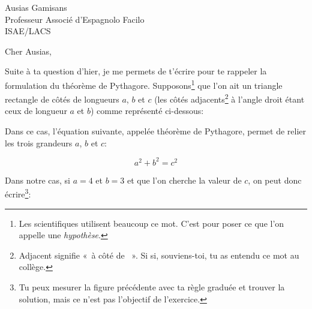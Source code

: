 \documentclass[pdftex,12pt,a4paper,origdate]{lettre}
\begin{document}


\begin{letter}{Ausias Gamisans\\ Professeur Associé d'Espagnolo
    Facilo\\ISAE/LACS}


\opening{Cher Ausias,}

Suite à ta question d'hier, je me permets de t'écrire pour te rappeler
la formulation du théorème de Pythagore. Supposons\footnote{Les
  scientifiques utilisent beaucoup ce mot. C'est pour poser ce que
  l'on appelle une \emph{hypothèse}.} que l'on ait un triangle
rectangle de côtés de longueurs $a$, $b$ et $c$ (les côtés
adjacents\footnote{Adjacent signifie «~à côté de ~». Si si,
  souviens-toi, tu as entendu ce mot au collège.} à l'angle droit
étant ceux de longueur $a$ et $b$) comme représenté ci-dessous:


  Dans ce cas, l'équation suivante, appelée théorème de Pythagore,
  permet de relier les trois grandeurs $a$, $b$ et $c$:

    \begin{equation}
      \label{eq:1}
      a^2 + b^2 = c^2
    \end{equation}

Dans notre cas, si $a = 4$ et $b = 3$ et que l'on cherche la valeur de
$c$, on peut donc écrire\footnote{Tu peux mesurer la figure précédente
  avec ta règle graduée et trouver la solution, mais ce n'est pas
  l'objectif de l'exercice.}:


\end{letter}
\end{document}
